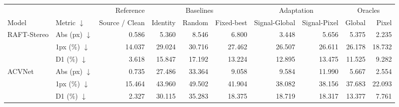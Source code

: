\begin{tabular}{llrrrrrrrr}
\toprule
 & & Reference & \multicolumn{3}{c}{Baselines} & \multicolumn{2}{c}{Adaptation} & \multicolumn{2}{c}{Oracles} \\
Model & Metric $\downarrow$ & Source / Clean & Identity & Random & Fixed-best & Signal-Global & Signal-Pixel & Global & Pixel \\
\midrule
RAFT-Stereo & Abs (px) $\downarrow$ & 0.586 & 5.360 & 8.546 & 6.800 & 3.448 & 5.656 & 5.375 & 2.235 \\
 & 1px (\%) $\downarrow$ & 14.037 & 29.024 & 30.716 & 27.462 & 26.507 & 26.611 & 26.178 & 18.732 \\
 & D1 (\%) $\downarrow$ & 3.618 & 15.847 & 17.192 & 13.224 & 12.895 & 13.475 & 11.525 & 9.282 \\
ACVNet & Abs (px) $\downarrow$ & 0.735 & 27.486 & 33.364 & 9.058 & 9.584 & 11.990 & 5.667 & 2.554 \\
 & 1px (\%) $\downarrow$ & 15.464 & 43.960 & 49.502 & 41.904 & 38.082 & 38.156 & 37.683 & 22.093 \\
 & D1 (\%) $\downarrow$ & 2.327 & 30.115 & 35.283 & 18.375 & 18.719 & 18.317 & 13.377 & 7.761 \\
\bottomrule
\end{tabular}
